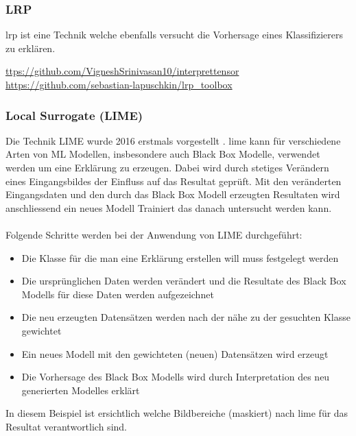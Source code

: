 \documentclass[
  12pt, %
  a4paper, %
  oneside, %
  openany, 
  numbers=noenddot, %
  BCOR=5mm, %
  parskip=half*, %
  thesis, %
]{bfhbook}
\begin{document}
\subsubsection*{LRP}
\acrfull{lrp} ist eine Technik welche ebenfalls versucht die Vorhersage eines Klassifizierers zu erklären. 

\url{ttps://github.com/VigneshSrinivasan10/interprettensor}
\url{https://github.com/sebastian-lapuschkin/lrp_toolbox}

\subsubsection*{Local Surrogate (LIME)}
\label{lime}
Die Technik LIME wurde 2016 erstmals vorgestellt \parencite{Ribeiro2016}. 
\Gls{lime} kann für verschiedene Arten von  \Gls{ML} Modellen, insbesondere auch Black Box Modelle, verwendet werden um eine Erklärung zu erzeugen. Dabei wird durch stetiges Verändern eines Eingangsbildes der Einfluss auf das Resultat geprüft. Mit den veränderten Eingangsdaten und den durch das Black Box Modell erzeugten Resultaten wird anschliessend ein neues Modell Trainiert das danach untersucht werden kann.

\paragraph*{}
Folgende Schritte werden bei der Anwendung von LIME durchgeführt:
\begin{itemize}
	\item Die Klasse für die man eine Erklärung erstellen will muss festgelegt werden
	\item Die ursprünglichen Daten werden verändert und die Resultate des Black Box Modells für diese Daten werden aufgezeichnet
	\item Die neu erzeugten Datensätzen werden nach der nähe zu der gesuchten Klasse gewichtet
	\item Ein neues Modell mit den gewichteten (neuen) Datensätzen wird erzeugt
	\item Die Vorhersage des Black Box Modells wird durch Interpretation des neu generierten Modelles erklärt
\end{itemize}
\break
In diesem Beispiel ist ersichtlich welche Bildbereiche (maskiert) nach \gls{lime} für das Resultat verantwortlich sind.
\end{document}
